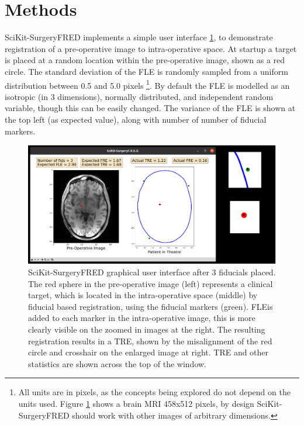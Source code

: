 \section{Methods}
SciKit-SurgeryFRED implements a simple user interface \ref{fig:surgery_fred}, to demonstrate registration of a pre-operative image to intra-operative space. At startup a target is placed at a random location within the pre-operative image, shown as a red circle. The standard deviation of the \gls{FLE} is randomly sampled from a uniform distribution 
between 0.5 and 5.0 pixels \footnote{All units are in pixels, as the concepts being explored do not depend on the units used. Figure \ref{fig:surgery_fred} shows a brain MRI 458x512 pixels, by design SciKit-SurgeryFRED should work with other images of arbitrary dimensions.}. By default the \gls{FLE} is modelled as an isotropic (in 3 dimensions), normally distributed, and independent random variable, though this can be easily changed. The variance of the \gls{FLE} is shown at the top left (as expected value), along with number of number of fiducial markers. 

\begin{figure}
	\begin{center}
	\includegraphics[width=0.9\linewidth]{scikit-surgeryfred_gui.eps}
		\caption{\label{fig:surgery_fred}SciKit-SurgeryFRED graphical user interface after 3 fiducials placed. The red sphere in the pre-operative image (left) represents a clinical target, which is located in the
		intra-operative space (middle) by fiducial based registration, using the fiducial markers (green). FLEis added to each marker in the intra-operative image, this is more clearly visible on the zoomed in images at the right. The resulting registration results in a TRE, shown by the misalignment of the red circle and crosshair 
		on the enlarged image at right. TRE and other statistics are shown across the top
		of the window.}
	\end{center}
\end{figure}

